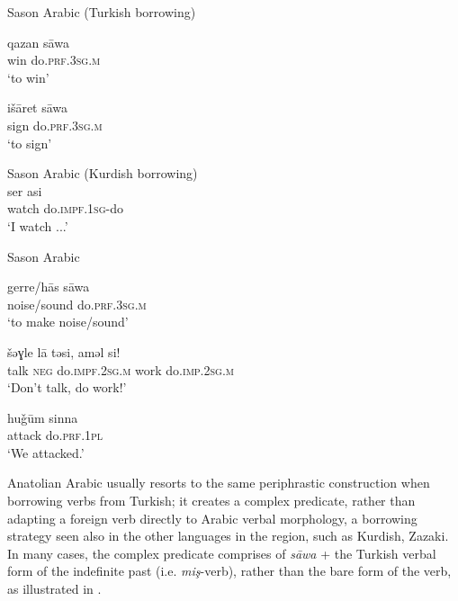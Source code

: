 \documentclass[output=paper]{langsci/langscibook}
\begin{document}
\begin{exe}
\ex \label{l} Sason Arabic (Turkish borrowing) 
		\begin{xlist}
			\ex \label{ltk2} \gll qazan 	s\={a}wa  \\
        win	do.\textsc{prf.3sg.m}\\
        \glt `to win'
		
		\ex \label{ltk1}\gll išāret s\={a}wa \\
    sign  do.\textsc{prf.3sg.m}\\
        \glt `to sign'



		\end{xlist}
        
      \ex \label{l3} Sason Arabic (Kurdish borrowing) \\
      \gll ser asi \\
        watch do.\textsc{impf.1sg}-do\\
        \glt `I watch ...'
        
        
        \ex \label{lar} Sason Arabic \\
		\begin{xlist}
		\ex \label{lar}\gll gerre/h\={a}s s\={a}wa\\
    noise/sound do.\textsc{prf.3sg.m}\\
        \glt `to make noise/sound'


	\ex \label{lar2} \gll šəɣle l\={a} təsi, aməl si!  \\
      talk \textsc{neg} do.\textsc{impf.2sg.m} work do.\textsc{imp.2sg.m}\\
        \glt `Don't talk, do work!'
        
        \ex \label{lar3}\gll hu\v{g}ūm sinna \\
    attack  do.\textsc{prf.1pl}\\
        \glt `We attacked.'
		\end{xlist}
        
\end{exe}

\noindent Anatolian Arabic usually resorts to the same periphrastic construction when borrowing verbs from Turkish; it creates a complex predicate, rather than adapting a foreign verb directly to Arabic verbal morphology, a borrowing strategy seen also in the other languages in the region, such as Kurdish, Zazaki. In many cases, the complex predicate comprises of \textit{s\={a}wa} + the Turkish verbal form of the indefinite past (i.e. \textit{mi\c{s}}-verb), rather than the bare form of the verb, as illustrated in .
\end{document}
